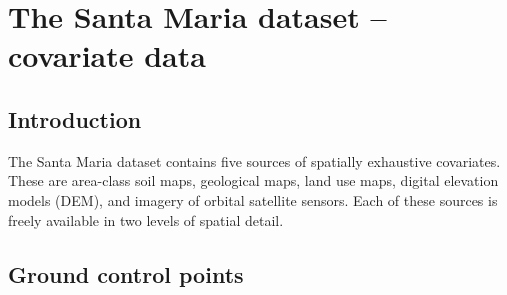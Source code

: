 
\artigofalse
\chapter{The Santa Maria dataset -- covariate data}
\label{apen:covar-data}

\tocless\section{Introduction}
\label{sec:covar-data-intro}

The Santa Maria dataset contains five sources of spatially exhaustive covariates. These are 
area-class soil maps, geological maps, land use maps, digital elevation models (DEM), and 
imagery of orbital satellite sensors. Each of these sources is freely available in two levels of 
spatial detail.




\tocless\section{Ground control points}
\label{sec:covar-data-gcp}

